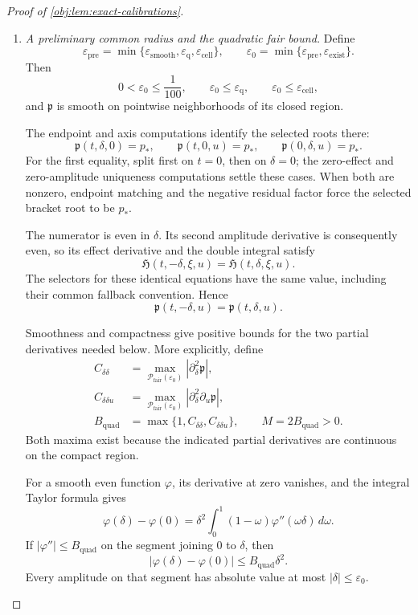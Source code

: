 \begin{proof}[Proof of \cref{obj:lem:exact-calibrations}]
\begin{enumerate}
\item \emph{A preliminary common radius and the quadratic fair bound.}
Define
\[
\varepsilon_{\mathrm{pre}}
=
\min\{\varepsilon_{\mathrm{smooth}},
      \varepsilon_{\mathrm q},
      \varepsilon_{\mathrm{cell}}\},
\qquad
\varepsilon_0
=
\min\{\varepsilon_{\mathrm{pre}},
      \varepsilon_{\mathrm{exist}}\}.
\]
Then
\[
0<\varepsilon_0\le\frac1{100},
\qquad
\varepsilon_0\le\varepsilon_{\mathrm q},
\qquad
\varepsilon_0\le\varepsilon_{\mathrm{cell}},
\]
and \(\mathfrak p\) is smooth on pointwise neighborhoods of its closed region.

The endpoint and axis computations identify the selected roots there:
\[
\mathfrak p(t,\delta,0)=p_*,
\qquad
\mathfrak p(t,0,u)=p_*,
\qquad
\mathfrak p(0,\delta,u)=p_*.
\]
For the first equality, split first on \(t=0\), then on \(\delta=0\); the zero-effect and zero-amplitude uniqueness computations settle these cases. When both are nonzero, endpoint matching and the negative residual factor force the selected bracket root to be \(p_*\).

The numerator is even in \(\delta\). Its second amplitude derivative is consequently even, so its effect derivative and the double integral satisfy
\[
\mathfrak H(t,-\delta,\xi,u)=\mathfrak H(t,\delta,\xi,u).
\]
The selectors for these identical equations have the same value, including their common fallback convention. Hence
\[
\mathfrak p(t,-\delta,u)=\mathfrak p(t,\delta,u).
\]

Smoothness and compactness give positive bounds for the two partial derivatives needed below. More explicitly, define
\[
\begin{aligned}
C_{\delta\delta}
&=
\max_{\mathcal P_{\mathrm{fair}}(\varepsilon_0)}
|\partial_\delta^2\mathfrak p|,\\
C_{\delta\delta u}
&=
\max_{\mathcal P_{\mathrm{fair}}(\varepsilon_0)}
|\partial_\delta^2\partial_u\mathfrak p|,\\
B_{\mathrm{quad}}
&=\max\{1,C_{\delta\delta},C_{\delta\delta u}\},
\qquad M=2B_{\mathrm{quad}}>0.
\end{aligned}
\]
Both maxima exist because the indicated partial derivatives are continuous on the compact region.

For a smooth even function \(\varphi\), its derivative at zero vanishes, and the integral Taylor formula gives
\[
\varphi(\delta)-\varphi(0)
=
\delta^2\int_0^1(1-\omega)\varphi''(\omega\delta)\,d\omega.
\]
If \(|\varphi''|\le B_{\mathrm{quad}}\) on the segment joining \(0\) to \(\delta\), then
\[
|\varphi(\delta)-\varphi(0)|
\le B_{\mathrm{quad}}\delta^2.
\]
Every amplitude on that segment has absolute value at most
\(|\delta|\le\varepsilon_0\).


\end{enumerate}
\end{proof}
